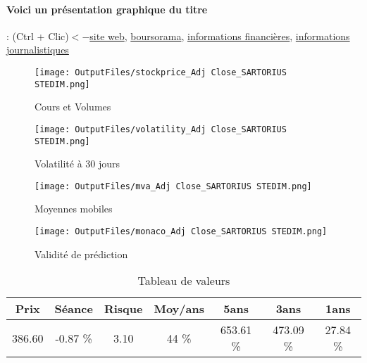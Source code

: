 \documentclass[11pt,a4paper]{report}%
\begin{document}
\paragraph{Voici un présentation graphique du titre} : (Ctrl + Clic)$<-$\href{https://www.sartorius.com/en/company-fr/investor-relations-fr}{site web}, \href{https://www.boursorama.com/cours/1rPDIM}{boursorama}, \href{https://www.qwant.com/?q=site:https:%2f%2fwww.easybourse.com%2faction-societe%2fSARTORIUS-STEDIM&t=web&client=ext-firefox-hp}{informations financières}, \href{https://bourse.lerevenu.com/cours-de-bourse/fiche-valeur-synthese/SARTORIUS-STEDIM/DIM-FR}{informations journalistiques}
\begin{figure}[!htb]
   \begin{minipage}{0.5\textwidth}
     \centering
     \texttt{[image: OutputFiles/stockprice\_Adj Close\_SARTORIUS STEDIM.png]}
     \caption{Cours et Volumes}\label{Fig:price_SARTORIUS STEDIM}
   \end{minipage}\hfill
   \begin{minipage}{0.5\textwidth}
     \centering
     \texttt{[image: OutputFiles/volatility\_Adj Close\_SARTORIUS STEDIM.png]}
     \caption{Volatilité à 30 jours}\label{Fig:volat_SARTORIUS STEDIM}
   \end{minipage}
\end{figure}
\begin{figure}[!htb]
   \begin{minipage}{0.5\textwidth}
     \centering
     \texttt{[image: OutputFiles/mva\_Adj Close\_SARTORIUS STEDIM.png]}
     \caption{Moyennes mobiles}\label{Fig:mva_SARTORIUS STEDIM}
   \end{minipage}\hfill
   \begin{minipage}{0.5\textwidth}
     \centering
     \texttt{[image: OutputFiles/monaco\_Adj Close\_SARTORIUS STEDIM.png]}
     \caption{Validité de prédiction}\label{Fig:prediction_SARTORIUS STEDIM}
   \end{minipage}
\end{figure}

\begin{table}[H]
  \centering
    \begin{tabular}{|c|c|c|c|c|c|c|}
    \hline
    Prix & Séance & Risque  & Moy/ans & 5ans & 3ans & 1ans \\
    \hline
    386.60 &    -0.87 \%    & 3.10 & 44 \% & 653.61 \% & 473.09 \% & 27.84 \% \\
    \hline
    \end{tabular}%
        \label{tab:table_SARTORIUS STEDIM}%
      \caption{Tableau de valeurs}
\end{table}%
\end{document}
